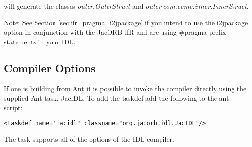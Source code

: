  will generate the classes
\emph{outer.OuterStruct} and \emph{outer.com.acme.inner.InnerStruct}.

Note: See Section \ref{sec:ifr_pragma_i2jpackage} if you intend to use the
i2jpackage option in conjunction with the JacORB IfR and are using \#pragma
prefix statements in your IDL.


\subsection*{Compiler Options}
If one is building from Ant it is possible to invoke the compiler directly
using the supplied Ant task, JacIDL. To add the taskdef add the following
to the ant script:
\small{
\begin{verbatim}
<taskdef name="jacidl" classname="org.jacorb.idl.JacIDL"/>
\end{verbatim}
}
The task supports all of the options of the IDL compiler.

